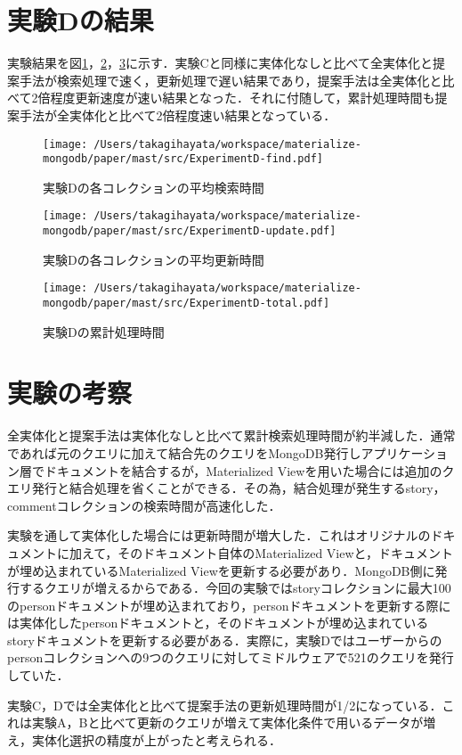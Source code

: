 \documentclass[a4paper,11pt]{ujreport}
\begin{document}
\section{実験Dの結果}
実験結果を図\ref{ExperimentD-find}，\ref{ExperimentD-update}，\ref{ExperimentD-total}に示す．実験Cと同様に実体化なしと比べて全実体化と提案手法が検索処理で速く，更新処理で遅い結果であり，提案手法は全実体化と比べて2倍程度更新速度が速い結果となった．それに付随して，累計処理時間も提案手法が全実体化と比べて2倍程度速い結果となっている．
\begin{figure}[htbp]
	\begin{center}
		\texttt{[image: /Users/takagihayata/workspace/materialize-mongodb/paper/mast/src/ExperimentD-find.pdf]} %
	\end{center}
	\caption{実験Dの各コレクションの平均検索時間}
	\label{ExperimentD-find}
\end{figure}
\begin{figure}[htbp]
	\begin{center}
		\texttt{[image: /Users/takagihayata/workspace/materialize-mongodb/paper/mast/src/ExperimentD-update.pdf]} %
	\end{center}
	\caption{実験Dの各コレクションの平均更新時間}
	\label{ExperimentD-update}
\end{figure}
\begin{figure}[htbp]
	\begin{center}
		\texttt{[image: /Users/takagihayata/workspace/materialize-mongodb/paper/mast/src/ExperimentD-total.pdf]} %
	\end{center}
	\caption{実験Dの累計処理時間}
	\label{ExperimentD-total}
\end{figure}

\section{実験の考察}
\label{sec:Consideration}
全実体化と提案手法は実体化なしと比べて累計検索処理時間が約半減した．通常であれば元のクエリに加えて結合先のクエリをMongoDB発行しアプリケーション層でドキュメントを結合するが，Materialized Viewを用いた場合には追加のクエリ発行と結合処理を省くことができる．その為，結合処理が発生するstory，commentコレクションの検索時間が高速化した．

実験を通して実体化した場合には更新時間が増大した．これはオリジナルのドキュメントに加えて，そのドキュメント自体のMaterialized Viewと，ドキュメントが埋め込まれているMaterialized Viewを更新する必要があり．MongoDB側に発行するクエリが増えるからである．今回の実験ではstoryコレクションに最大100のpersonドキュメントが埋め込まれており，personドキュメントを更新する際には実体化したpersonドキュメントと，そのドキュメントが埋め込まれているstoryドキュメントを更新する必要がある．実際に，実験Dではユーザーからのpersonコレクションへの9つのクエリに対してミドルウェアで521のクエリを発行していた．

実験C，Dでは全実体化と比べて提案手法の更新処理時間が1/2になっている．これは実験A，Bと比べて更新のクエリが増えて実体化条件で用いるデータが増え，実体化選択の精度が上がったと考えられる．
\end{document}
